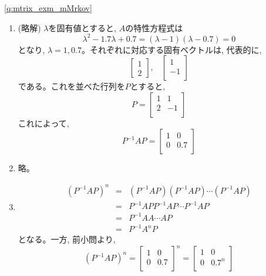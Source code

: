 %
\ref{q:mtrix_exm_mMrkov}
\begin{enumerate}
\item (略解) $\lambda$を固有値とすると, $A$の特性方程式は
\begin{equation*}
\lambda^2-1.7\lambda+0.7=(\lambda-1)(\lambda-0.7)=0
\end{equation*}
となり, $\lambda=1, 0.7$。それぞれに対応する固有ベクトルは, 代表的に, 
\begin{equation*}
\begin{bmatrix}
1\\
2
\end{bmatrix},\,\,\,\,\,
\begin{bmatrix}
1\\
-1\\
\end{bmatrix}
\end{equation*}
である。これを並べた行列を$P$とすると, 
\begin{equation}
P=\begin{bmatrix}
1 & 1\\
2 & -1\\
\end{bmatrix}
\end{equation}
これによって, 
\begin{equation}
P^{-1}AP=\begin{bmatrix}
1 & 0\\
0 & 0.7\\
\end{bmatrix}
\end{equation}
\item 略。
\item
\begin{eqnarray*}
(P^{-1}AP)^n&=&(P^{-1}AP)(P^{-1}AP)\cdots(P^{-1}AP)\\
&=&P^{-1}APP^{-1}AP\cdots P^{-1}AP\\
&=&P^{-1}AA\cdots AP\\
&=&P^{-1}A^nP
\end{eqnarray*}
となる。一方, 前小問より, 
\begin{equation}
(P^{-1}AP)^n=\begin{bmatrix}
1 & 0\\
0 & 0.7\\
\end{bmatrix}^n
=\begin{bmatrix}
1 & 0\\
0 & 0.7^n\\
\end{bmatrix}

\end{equation}
\end{enumerate}
